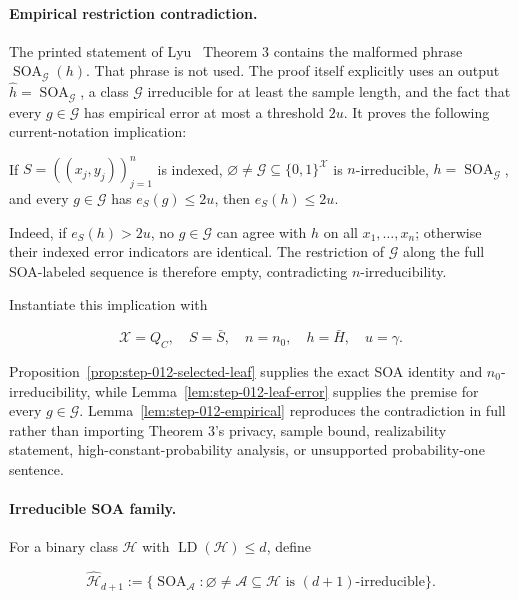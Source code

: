 \paragraph{Empirical restriction contradiction.}

The printed statement of Lyu~\citep{lyu2025} Theorem 3 contains the malformed
phrase \(\operatorname{SOA}_{\mathcal G}(h)\). That phrase is not used. The
proof itself explicitly uses an output
\(\widehat h=\operatorname{SOA}_{\mathcal G}\), a class
\(\mathcal G\) irreducible for at least the sample length, and the fact that
every \(g\in\mathcal G\) has empirical error at most a threshold \(2u\).
It proves the following current-notation implication:

If \(S=((x_j,y_j))_{j=1}^n\) is indexed, \(\varnothing\ne\mathcal G\subseteq
\{0,1\}^{\mathcal X}\) is \(n\)-irreducible,
\(h=\operatorname{SOA}_{\mathcal G}\), and every \(g\in\mathcal G\) has
\(e_S(g)\le2u\), then \(e_S(h)\le2u\).

Indeed, if \(e_S(h)>2u\), no \(g\in\mathcal G\) can agree with \(h\) on
all \(x_1,\ldots,x_n\); otherwise their indexed error indicators are
identical. The restriction of \(\mathcal G\) along the full SOA-labeled
sequence is therefore empty, contradicting \(n\)-irreducibility.

Instantiate this implication with

\[
 \mathcal X=Q_C,
 \quad S=\bar S,
 \quad n=n_0,
 \quad h=\bar H,
 \quad u=\gamma.
\tag{15}
\]

Proposition~\ref{prop:step-012-selected-leaf} supplies the exact SOA
identity and \(n_0\)-irreducibility, while
Lemma~\ref{lem:step-012-leaf-error} supplies the premise for every
\(g\in\mathcal G\). Lemma~\ref{lem:step-012-empirical} reproduces the
contradiction in full rather than importing Theorem 3's privacy, sample
bound, realizability statement, high-constant-probability analysis, or
unsupported probability-one sentence.

\paragraph{Irreducible SOA family.}

For a binary class \(\mathcal H\) with
\(\operatorname{LD}(\mathcal H)\le d\), define

\[
 \widehat{\mathcal H}_{d+1}
 :=\{\operatorname{SOA}_{\mathcal A}:
       \varnothing\ne\mathcal A\subseteq\mathcal H
       \text{ is }(d+1)\text{-irreducible}\}.
\tag{16}
\]

